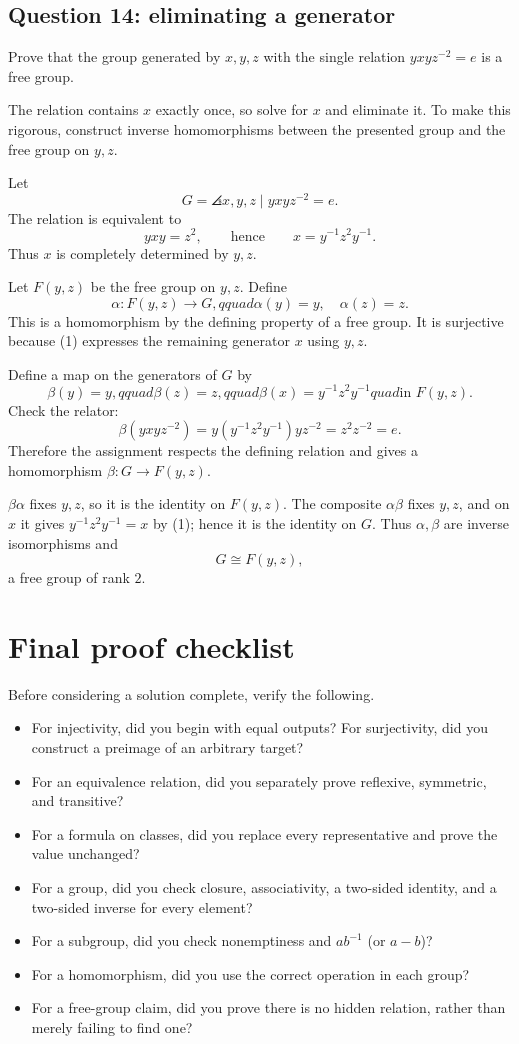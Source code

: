 \documentclass[11pt,openany]{book}
\begin{document}
\section{Question 14: eliminating a generator}
\begin{questionbox}
Prove that the group generated by $x,y,z$ with the single relation $yxyz^{-2}=e$ is a free group.
\end{questionbox}
\begin{approachbox}
The relation contains $x$ exactly once, so solve for $x$ and eliminate it. To make this rigorous, construct inverse homomorphisms between the presented group and the free group on $y,z$.
\end{approachbox}
\begin{solutionbox}
Let
\[
G=\angles{x,y,z\mid yxyz^{-2}=e}.
\]
The relation is equivalent to
\[
yxy=z^2,
\qquad\text{hence}\qquad
x=y^{-1}z^2y^{-1}. \tag{1}
\]
Thus $x$ is completely determined by $y,z$.

Let $F(y,z)$ be the free group on $y,z$. Define
\[
\alpha:F(y,z)\to G,qquad \alpha(y)=y,\quad\alpha(z)=z.
\]
This is a homomorphism by the defining property of a free group. It is surjective because (1) expresses the remaining generator $x$ using $y,z$.

Define a map on the generators of $G$ by
\[
\beta(y)=y,qquad \beta(z)=z,qquad
\beta(x)=y^{-1}z^2y^{-1}quad\text{in }F(y,z).
\]
Check the relator:
\[
\beta(yxyz^{-2})
=y(y^{-1}z^2y^{-1})yz^{-2}
=z^2z^{-2}=e.
\]
Therefore the assignment respects the defining relation and gives a homomorphism $\beta:G\to F(y,z)$.

$\beta\alpha$ fixes $y,z$, so it is the identity on $F(y,z)$. The composite $\alpha\beta$ fixes $y,z$, and on $x$ it gives $y^{-1}z^2y^{-1}=x$ by (1); hence it is the identity on $G$. Thus $\alpha,\beta$ are inverse isomorphisms and
\[
G\cong F(y,z),
\]
a free group of rank $2$.
\end{solutionbox}

\chapter*{Final proof checklist}
Before considering a solution complete, verify the following.
\begin{itemize}
\item For injectivity, did you begin with equal outputs? For surjectivity, did you construct a preimage of an arbitrary target?
\item For an equivalence relation, did you separately prove reflexive, symmetric, and transitive?
\item For a formula on classes, did you replace every representative and prove the value unchanged?
\item For a group, did you check closure, associativity, a two-sided identity, and a two-sided inverse for every element?
\item For a subgroup, did you check nonemptiness and $ab^{-1}$ (or $a-b$)?
\item For a homomorphism, did you use the correct operation in each group?
\item For a free-group claim, did you prove there is no hidden relation, rather than merely failing to find one?
\end{itemize}
\end{document}
